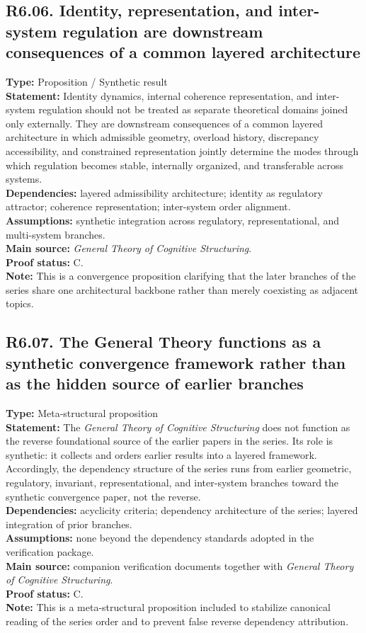 \documentclass[12pt]{article}
\begin{document}
	\subsection*{R6.06. Identity, representation, and inter-system regulation are downstream consequences of a common layered architecture}
	\textbf{Type:} Proposition / Synthetic result \\
	\textbf{Statement:} Identity dynamics, internal coherence representation, and inter-system
	regulation should not be treated as separate theoretical domains joined only externally. They
	are downstream consequences of a common layered architecture in which admissible geometry,
	overload history, discrepancy accessibility, and constrained representation jointly determine
	the modes through which regulation becomes stable, internally organized, and transferable across
	systems. \\
	\textbf{Dependencies:} layered admissibility architecture; identity as regulatory attractor;
	coherence representation; inter-system order alignment. \\
	\textbf{Assumptions:} synthetic integration across regulatory, representational, and multi-system
	branches. \\
	\textbf{Main source:} \emph{General Theory of Cognitive Structuring}. \\
	\textbf{Proof status:} C. \\
	\textbf{Note:} This is a convergence proposition clarifying that the later branches of the
	series share one architectural backbone rather than merely coexisting as adjacent topics.
	
	\subsection*{R6.07. The General Theory functions as a synthetic convergence framework rather than as the hidden source of earlier branches}
	\textbf{Type:} Meta-structural proposition \\
	\textbf{Statement:} The \emph{General Theory of Cognitive Structuring} does not function as the
	reverse foundational source of the earlier papers in the series. Its role is synthetic: it
	collects and orders earlier results into a layered framework. Accordingly, the dependency
	structure of the series runs from earlier geometric, regulatory, invariant, representational,
	and inter-system branches toward the synthetic convergence paper, not the reverse. \\
	\textbf{Dependencies:} acyclicity criteria; dependency architecture of the series; layered
	integration of prior branches. \\
	\textbf{Assumptions:} none beyond the dependency standards adopted in the verification package. \\
	\textbf{Main source:} companion verification documents together with \emph{General Theory of
		Cognitive Structuring}. \\
	\textbf{Proof status:} C. \\
	\textbf{Note:} This is a meta-structural proposition included to stabilize canonical reading of
	the series order and to prevent false reverse dependency attribution.
	
\end{document}
